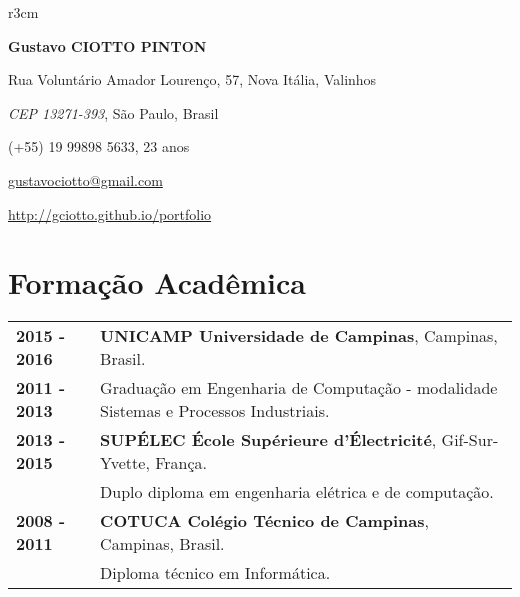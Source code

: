 \documentclass[10pt, a4paper]{article}
\author{Gustavo Ciotto Pinton}
\begin{document}
\pagestyle{empty}

\begin{wrapfigure}{r}{3cm}
\vspace{-20pt}
\begin{center}
\end{center}
\end{wrapfigure}

\textbf{\LARGE Gustavo CIOTTO PINTON}

Rua Voluntário Amador Lourenço, 57, Nova Itália, Valinhos

\textit{CEP 13271-393}, São Paulo, Brasil

(+55) 19 99898 5633, 23 anos

\url{gustavociotto@gmail.com}

\url{http://gciotto.github.io/portfolio}

\vspace{8pt}




\section{Formação Acadêmica}

\begin{tabular}{p{} p{}}

\textbf{2015 - 2016} & \textbf{UNICAMP Universidade de Campinas}, Campinas,
Brasil.
\\
\textbf{2011 - 2013} & Graduação em Engenharia de Computação - modalidade
Sistemas e Processos Industriais. \vspace{8pt}\\

\textbf{2013 - 2015} & \textbf{SUPÉLEC  École Supérieure d'Électricité},
Gif-Sur-Yvette, França. \\
& Duplo diploma em  engenharia elétrica e de computação. \vspace{8pt} \\

\textbf{2008 - 2011} & \textbf{COTUCA Colégio Técnico de Campinas}, Campinas,
Brasil. \\
& Diploma técnico em Informática. \\
\end{tabular}
\end{document}
